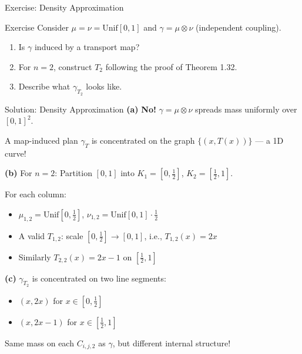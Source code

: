 \documentclass[aspectratio=169]{beamer}
\begin{document}
\begin{frame}{Exercise: Density Approximation}
\begin{block}{Exercise}
Consider $\mu = \nu = \text{Unif}[0,1]$ and $\gamma = \mu \otimes \nu$ (independent coupling).
\begin{enumerate}
    \item[(a)] Is $\gamma$ induced by a transport map?
    \item[(b)] For $n = 2$, construct $T_2$ following the proof of Theorem 1.32.
    \item[(c)] Describe what $\gamma_{T_2}$ looks like.
\end{enumerate}
\end{block}

\begin{center}
\end{center}
\end{frame}

\begin{frame}{Solution: Density Approximation}
\textbf{(a)} \textbf{No!} $\gamma = \mu \otimes \nu$ spreads mass uniformly over $[0,1]^2$.

A map-induced plan $\gamma_T$ is concentrated on the graph $\{(x, T(x))\}$ --- a 1D curve!

\vspace{0.3cm}
\textbf{(b)} For $n = 2$: Partition $[0,1]$ into $K_1 = [0, \frac{1}{2}]$, $K_2 = [\frac{1}{2}, 1]$.

For each column:
\begin{itemize}
    \item $\mu_{1,2} = \text{Unif}[0, \frac{1}{2}]$, $\nu_{1,2} = \text{Unif}[0,1] \cdot \frac{1}{2}$
    \item A valid $T_{1,2}$: scale $[0, \frac{1}{2}] \to [0, 1]$, i.e., $T_{1,2}(x) = 2x$
    \item Similarly $T_{2,2}(x) = 2x - 1$ on $[\frac{1}{2}, 1]$
\end{itemize}

\vspace{0.2cm}
\textbf{(c)} $\gamma_{T_2}$ is concentrated on two line segments:
\begin{itemize}
    \item $(x, 2x)$ for $x \in [0, \frac{1}{2}]$
    \item $(x, 2x-1)$ for $x \in [\frac{1}{2}, 1]$
\end{itemize}

Same mass on each $C_{i,j,2}$ as $\gamma$, but different internal structure!
\end{frame}
\end{document}

